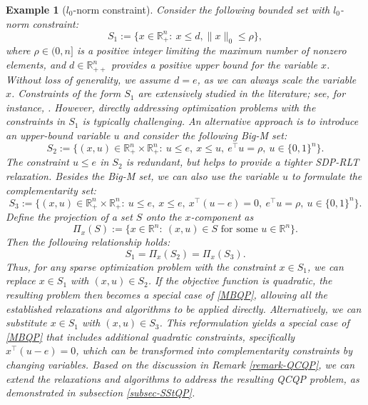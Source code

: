 \documentclass[11pt]{article}
\theoremstyle{plain}
\newtheorem{example}{Example}
\def\R{\mathbb{R}}
\begin{document}
\begin{example}[$l_0$-norm constraint]\label{example-L0} 
Consider the following bounded set with $l_0$-norm constraint:
\begin{equation*}
S_1:=\{x\in\R_+^n:\ x\leq d,\|x\|_0\leq \rho \},
\end{equation*}
where $\rho \in (0, n]$ is a positive integer limiting the maximum number of nonzero elements, and $d \in \mathbb{R}_{++}^n$ provides a positive upper bound for the variable $x$. Without loss of generality, we assume $d = e$, as we can always scale the variable $x$. Constraints of the form $S_1$ are extensively studied in the literature; see, for instance, \cite{atamturk2021sparse,bomze2024tighter}. However, directly addressing optimization problems with the constraints in $S_1$  is typically challenging. An alternative approach is to introduce an upper-bound variable $u$ and consider the following Big-M set:
\begin{equation*}
S_2:=\{(x,u)\in\R_+^n\times \R_+^n:\ u\leq e,\ x\leq u,\ e^\top u=\rho,\ u\in \{0,1\}^n \}.
\end{equation*}
The constraint $u\leq e$ in $S_2$ is redundant, but helps to provide a tighter SDP-RLT relaxation. Besides the Big-M set, we can also use the variable $u$ to formulate the complementarity set: 
\begin{equation}\label{L0-comp}
S_3:=\{(x,u)\in\R_+^n\times \R_+^n:\  u\leq e,\ x\leq e,\ x^\top(u-e)=0,\ e^\top u=\rho,\ u\in \{0,1\}^n \}.
\end{equation}
Define the projection of a set $S$ onto the $x$-component as
\[
\Pi_x(S):=\{x\in \R^n:\ (x,u)\in S \text{ for some } u\in\R^n \}.
\]
Then the following relationship holds:
\[
S_1=\Pi_x(S_2)=\Pi_x(S_3). 
\]
Thus, for any sparse optimization problem with the constraint $x \in S_1$, we can replace $x \in S_1$ with $(x, u) \in S_2$. If the objective function is quadratic, the resulting problem then becomes a special case of \eqref{MBQP}, allowing all the established relaxations and algorithms to be applied directly.
Alternatively, we can substitute $x \in S_1$ with $(x, u) \in S_3$. This reformulation yields a special case of \eqref{MBQP} that includes additional quadratic constraints, specifically $x^\top(u - e) = 0$, which can be transformed into complementarity constraints by changing variables. Based on the discussion in Remark \ref{remark-QCQP}, we can extend the relaxations and algorithms to address the resulting QCQP problem, as demonstrated in subsection \ref{subsec-SStQP}.


\end{example}
\end{document}
